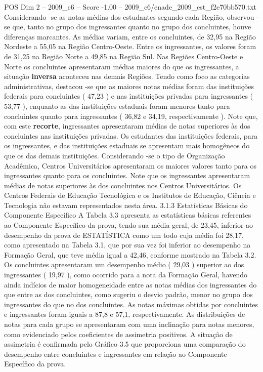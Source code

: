 \begin{textsample}{POS Dim 2 – 2009\_c6 – Score -1.00 – 2009\_c6/enade\_2009\_est\_f2e70bb570.txt}
Considerando -se as notas médias dos estudantes segundo cada Região, observou -se que, tanto no grupo dos ingressantes quanto no grupo dos concluintes, houve diferenças marcantes.
As médias variam, entre os concluintes, de 32,95 na Região Nordeste a 55,05 na Região Centro-Oeste.
Entre os ingressantes, os valores foram de 31,25 na Região Norte a 49,85 na Região Sul.
Nas Regiões Centro-Oeste e Norte os concluintes apresentaram médias maiores do que os ingressantes, a situação \textbf{inversa} aconteceu nas demais Regiões.
Tendo como foco as categorias administrativas, destacou -se que as maiores notas médias foram das instituições federais para concluintes ( 47,23 ) e nas instituições privadas para ingressantes ( 53,77 ), enquanto as das instituições estaduais foram menores tanto para concluintes quanto para ingressantes ( 36,82 e 34,19, respectivamente ).
Note que, com este \textbf{recorte}, ingressantes apresentaram médias de notas superiores às dos concluintes nas instituições privadas.
Os estudantes das instituições federais, para os ingressantes, e das instituições estaduais se apresentam mais homogêneos do que os das demais instituições.
Considerando -se o tipo de Organização Acadêmica, Centros Universitários apresentaram os maiores valores tanto para os ingressantes quanto para os concluintes.
Note que os ingressantes apresentaram médias de notas superiores às dos concluintes nos Centros Universitários.
Os Centros Federais de Educação Tecnológica e os Institutos de Educação, Ciência e Tecnologia não estavam representados nesta área. 3.1.3 Estatísticas Básicas do Componente Específico A Tabela 3.3 apresenta as estatísticas básicas referentes ao Componente Específico da prova, tendo sua média geral, de 23,45, inferior ao desempenho da prova de ESTATÍSTICA como um todo cuja média foi 28,17, como apresentado na Tabela 3.1, que por sua vez foi inferior ao desempenho na Formação Geral, que teve média igual a 42,46, conforme mostrado na Tabela 3.2.
Os concluintes apresentaram um desempenho médio ( 29,03 ) superior ao dos ingressantes ( 19,97 ), como ocorrido para a nota da Formação Geral, havendo ainda indícios de maior homogeneidade entre as notas médias dos ingressantes do que entre as dos concluintes, como sugeriu o desvio padrão, menor no grupo dos ingressantes do que no dos concluintes.
As notas máximas obtidas por concluintes e ingressantes foram iguais a 87,8 e 57,1, respectivamente.
As distribuições de notas para cada grupo se apresentaram com uma inclinação para notas menores, como evidenciado pelos coeficientes de assimetria positivos.
A situação de assimetria é confirmada pelo Gráfico 3.5 que proporciona uma comparação do desempenho entre concluintes e ingressantes em relação ao Componente Específico da prova.

\end{textsample}
